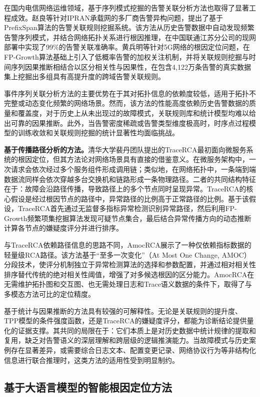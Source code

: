 在国内电信网络运维领域，基于序列模式挖掘的告警关联分析方法也取得了显著工程成效。赵良等针对IPRAN承载网的多厂商告警异构问题，提出了基于PrefixSpan算法的告警关联规则挖掘系统。该方法从历史告警数据中自动发现频繁告警序列模式，并结合网络拓扑关系进行根因推理，在中国联通江苏分公司的现网部署中实现了99\%的告警关联准确率。黄兵明等针对5G网络的根因定位问题，在FP-Growth算法基础上引入了低概率告警的加权关注机制，并将关联规则挖掘与时间序列因果推断相结合以区分相关性与因果性，在包含4,122万条告警的真实数据集上挖掘出多组具有高提升度的跨域告警关联规则。

事件序列关联分析方法的主要优势在于其对拓扑信息的依赖度较低，适用于拓扑不完整或动态变化频繁的网络场景。然而，该方法的性能高度依赖历史告警数据的质量和覆盖度，对于历史上从未出现过的故障模式，关联规则库和统计模型均难以给出可靠的因果推断。此外，当告警密度稀疏或告警类型维度极高时，时序点过程模型的训练收敛和关联规则挖掘的统计显著性均面临挑战。

\textbf{基于传播路径分析的方法。}清华大学裴丹团队提出的TraceRCA最初面向微服务系统的根因定位，但其方法论对网络场景具有直接的借鉴意义。在微服务架构中，一次请求会依次经过多个服务组件形成调用链；类似地，在网络拓扑中，一条端到端数据流同样会依次穿越多台交换机和链路形成一条物理路径。二者的共同结构特征在于：故障会沿路径传播，导致路径上的多个节点同时呈现异常。TraceRCA的核心假设是经过根因节点的路径中，异常路径的比例高于正常路径的比例。基于该假设，TraceRCA首先通过无监督多指标异常检测识别异常路径，然后利用FP-Growth频繁项集挖掘算法发现可疑节点集合，最后结合异常传播方向的动态推断计算各节点的嫌疑度评分并进行排序。

与TraceRCA依赖路径信息的思路不同，AmocRCA展示了一种仅依赖指标数据的轻量级RCA路径。该方法基于“至多一次变化”（At Most One Change, AMOC）分段技术，使评分机制独立于异常检测算法的选择和参数配置，并通过相对相关性排序替代传统的绝对相关性阈值，增强了对多候选根因的区分能力。AmocRCA在无需维护拓扑图和交互图、也无需处理日志和Trace语义数据的条件下，取得了与多模态方法可比的定位精度。

基于统计与因果推断的方法具有较强的可解释性。无论是关联规则的提升度、TPP模型的条件强度函数，还是TraceRCA的嫌疑度评分，都能为诊断结论提供量化的证据支撑。其共同的局限在于：它们本质上是对历史数据中统计规律的提取和复用，缺乏对告警语义的深层理解和跨层级的逻辑推演能力。当故障模式与历史案例存在显著差异，或需要综合日志文本、配置变更记录、网络协议行为等非结构化信息进行联合推理时，这类方法的适用性受到明显制约。

\subsection{基于大语言模型的智能根因定位方法}

